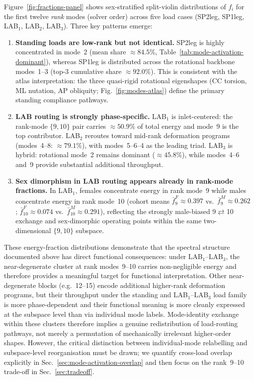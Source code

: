 \documentclass[11pt]{article}
\begin{document}
Figure~\ref{fig:fractions-panel} shows sex-stratified split-violin distributions of $f_i$ for the first twelve \emph{rank} modes (solver order) across five load cases (SP2leg, SP1leg, LAB$_1$, LAB$_2$, LAB$_3$).
Three key patterns emerge:
\begin{enumerate}[leftmargin=1.4em]
\item \textbf{Standing loads are low-rank but not identical.}
  SP2leg is highly concentrated in mode~2 (mean share $\approx 84.5\%$, Table~\ref{tab:mode-activation-dominant}), whereas SP1leg is distributed across the rotational backbone modes~1--3 (top-3 cumulative share $\approx 92.0\%$).
  This is consistent with the atlas interpretation: the three quasi-rigid rotational eigenshapes (CC torsion, ML nutation, AP obliquity; Fig.~\ref{fig:modes-atlas}) define the primary standing compliance pathways.
\item \textbf{LAB routing is strongly phase-specific.}
  LAB$_1$ is inlet-centered: the rank-mode $\{9,10\}$ pair carries $\approx 50.9\%$ of total energy and mode~9 is the top contributor.
  LAB$_2$ reroutes toward mid-rank deformation programs (modes~4--8: $\approx 79.1\%$), with modes~5--6--4 as the leading triad.
  LAB$_3$ is hybrid: rotational mode~2 remains dominant ($\approx 45.8\%$), while modes~4--6 and~9 provide substantial additional throughput.
\item \textbf{Sex dimorphism in LAB routing appears already in rank-mode fractions.}
  In LAB$_1$, females concentrate energy in rank mode~9 while males concentrate energy in rank mode~10 (cohort means $\bar f_9^{F}\!\approx\!0.397$ vs.\ $\bar f_9^{M}\!\approx\!0.262$; $\bar f_{10}^{F}\!\approx\!0.074$ vs.\ $\bar f_{10}^{M}\!\approx\!0.291$), reflecting the strongly male-biased 9$\rightleftarrows$10 exchange and sex-dimorphic operating points within the same two-dimensional $\{9,10\}$ subspace.
\end{enumerate}
These energy-fraction distributions demonstrate that the spectral structure documented above has direct functional consequences: under LAB$_1$--LAB$_3$, the near-degenerate cluster at rank modes~9--10 carries non-negligible energy and therefore provides a meaningful target for functional interpretation.
Other near-degenerate blocks (e.g.\ 12--15) encode additional higher-rank deformation programs, but their throughput under the standing and LAB$_1$--LAB$_3$ load family is more phase-dependent and their functional meaning is more cleanly expressed at the subspace level than via individual mode labels.
Mode-identity exchange within these clusters therefore implies a genuine redistribution of load-routing pathways, not merely a permutation of mechanically irrelevant higher-order shapes.
However, the critical distinction between individual-mode relabelling and subspace-level reorganisation must be drawn; we quantify cross-load overlap explicitly in Sec.~\ref{sec:mode-activation-overlap} and then focus on the rank~9--10 trade-off in Sec.~\ref{sec:tradeoff}.
\end{document}
